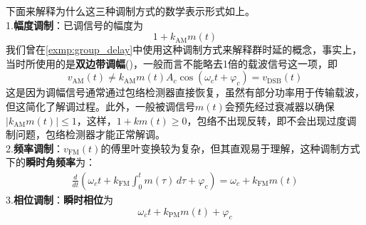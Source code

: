 下面来解释为什么这三种调制方式的数学表示形式如上。\\
1.\textbf{幅度调制}：已调信号的幅度为\[1+k_{\text{AM}}m(t)\]
我们曾在\cref{exmp:group_delay}中使用这种调制方式来解释群时延的概念，事实上，当时所使用的是\textbf{双边带调幅}()，一般而言不能略去1倍的载波信号这一项，即
\[v_{\text{AM}}(t)\neq k_{\text{AM}} m(t)A_c \cos(\omega_c t+\varphi_c)=v_{\text{DSB}}(t)\]
这是因为调幅信号通常通过包络检测器直接恢复，虽然有部分功率用于传输载波，但这简化了解调过程。此外，一般被调信号$m(t)$会预先经过衰减器以确保$|k_{\text{AM}}m(t)|\leq 1$，这样，$1+km(t)\geq 0$，包络不出现反转，即不会出现过度调制问题，包络检测器才能正常解调。\\
2.\textbf{频率调制}：$v_{\text{FM}}(t)$的傅里叶变换较为复杂，但其直观易于理解，这种调制方式下的\textbf{瞬时角频率}为：\begin{align*}
    \frac{d}{dt}\left(\omega_c t+k_{\text{FM}}\int_{0}^{t}m(\tau)\,d\tau+\varphi_c\right)=\omega_c+k_{\text{FM}}m(t)
\end{align*}
3.\textbf{相位调制}：\textbf{瞬时相位}为\[\omega_c t+k_{\text{PM}} m(t)+\varphi_c\]

